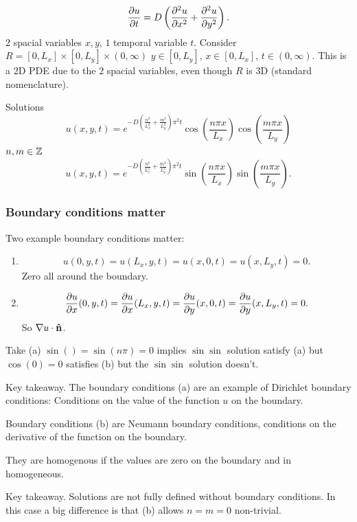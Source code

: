 \documentclass[10pt, a4paper]{article}
\begin{document}
\begin{example}
    \[
    \pd[u]{t} = D\left(\frac{\partial ^ 2u}{\partial x ^ 2} + \frac{\partial ^ 2u}{\partial y ^ 2}\right).
    \]
    $2$ spacial variables $x, y$,
    $1$ temporal variable $t$.
    Consider $R = [0, L_x] \times [0, L_y] \times (0, \infty)$
    $y \in [0, L_y]$,
    $x \in [0, L_x]$,
    $t \in (0, \infty)$.
    This is a $2$D PDE due to the $2$ spacial variables,
    even though $R$ is $3$D
    (standard nomenclature).

    Solutions
    \[
    u(x, y, t) = e ^ {-D\left(\frac{n ^ 2}{L_{x} ^ 2} + \frac{m ^ 2}{L_{y} ^ 2}\right)\pi ^ 2t}\cos\left(\frac{n\pi x}{L_{x}}\right)\cos\left(\frac{m\pi x}{L_{y}}\right)
    \]
    $n, m \in \Z$
    \[
    u(x, y, t) = e ^ {-D\left(\frac{n ^ 2}{L_{x} ^ 2} + \frac{m ^ 2}{L_{y} ^ 2}\right)\pi ^ 2t}\sin\left(\frac{n\pi x}{L_{x}}\right)\sin\left(\frac{m\pi x}{L_{y}}\right).
    \]
\end{example}

\subsubsection{Boundary conditions matter}
Two example boundary conditions matter:
\begin{enumerate}[label = (\alph*)]
    \item
    \[
    u(0, y, t) = u(L_x, y, t) = u(x, 0, t) = u(x, L_y, t) = 0.
    \]
    Zero all around the boundary.
    
    \item
    \[
    \pd[u]{x}(0, y, t) = \pd[u]{x}(L_x, y, t) = \pd[u]{y}(x, 0, t) = \pd[u]{y}(x, L_y, t) = 0.
    \]
    So $\bnabla u \cdot \hvec{n}$.
\end{enumerate}
Take (a)
$\sin() = \sin(n\pi) = 0$ implies $\sin\sin$ solution satisfy
(a)
but $\cos(0) = 0$ satisfies
(b)
but the $\sin\sin$ solution doesn't.

Key takeaway.
The boundary conditions
(a)
are an example of Dirichlet boundary conditions:
Conditions on the value of the function $u$ on the boundary.

Boundary conditions
(b)
are Neumann boundary conditions,
conditions on the derivative of the function on the boundary.

They are homogenous if the values are zero on the boundary and in homogeneous.

Key takeaway.
Solutions are not fully defined without boundary conditions.
In this case a big difference is that
(b)
allows $n = m = 0$ non-trivial.
\end{document}
